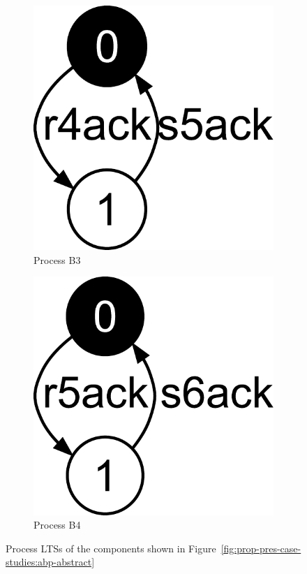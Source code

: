 \begin{figure}[hbt]
\begin{subfigure}[b]{100pt}
    \includegraphics[scale=0.2]{prop-pres-case-studies/figs/abp-B3}
    \caption{Process B3}
  \end{subfigure}
  \hfill
  \begin{subfigure}[b]{130pt}
    \centering
    \includegraphics[scale=0.2]{prop-pres-case-studies/figs/abp-B4}
    \caption{Process B4}
  \end{subfigure}
  \caption{Process LTSs of the components shown in Figure~\ref{fig:prop-pres-case-studies:abp-abstract}}
  \label{fig:lts-transformation:abp_processes}
\end{figure}

